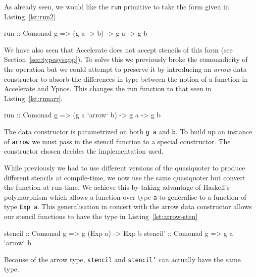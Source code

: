 \documentclass[12pt,a4paper,oneside]{scrbook}
\begin{document}
As already seen, we would like the \texttt{run} primitive to take the
form given in Listing~\ref{lst:run2}

\begin{hflisting}[label={lst:run2}, caption=The comonadic run type. Changing the
  type of \texttt{g} could change the backend used.]
run :: Comonad g => (g a -> b) -> g a -> g b
\end{hflisting}

We have also seen that Accelerate does not accept stencils of this form (see
Section~\ref{sec:typesysapp}).  To solve this we previously broke the
comonadicity of the operation but we could attempt to preserve it by introducing
an \emph{arrow} data constructor to absorb the differences in type between the
notion of a function in Accelerate and Ypnos. This changes the run function to
that seen in Listing~\ref{lst:runarr}.

\begin{hflisting}[label={lst:runarr}, caption=The type run is generalised to
  using the \texttt{arrow} type.]
run :: Comonad g => (g a `arrow` b) -> g a -> g b
\end{hflisting}

The data constructor is parametrized on both \texttt{g a} and
\texttt{b}. To build up an instance of \texttt{arrow} we must pass in the
stencil function to a special constructor. The constructor chosen
decides the implementation used.

While previously we had to use different versions of the quasiquoter to
produce different stencils at compile-time, we now use the same
quasiquoter but convert the function at run-time. We achieve this by
taking advantage of Haskell's polymorphism which allows a function over
type \texttt{a} to generalise to a function of type \texttt{Exp a}. This
generalisation in concert with the arrow data constructor allows our
stencil functions to have the type in Listing~\ref{lst:arrow-sten}

\begin{hflisting}[label={lst:arrow-sten}, caption=Here we see the type the
  stencil must have in Accelerate (\texttt{stencil}) and the type we can
  generalise to using the \texttt{arrow} type (\texttt{stencil'}).]
stencil :: Comonad g => g (Exp a) -> Exp b
stencil' :: Comonad g => g a `arrow` b
\end{hflisting}

Because of the arrow type, \texttt{stencil} and \texttt{stencil'} can
actually have the same type.
\end{document}
